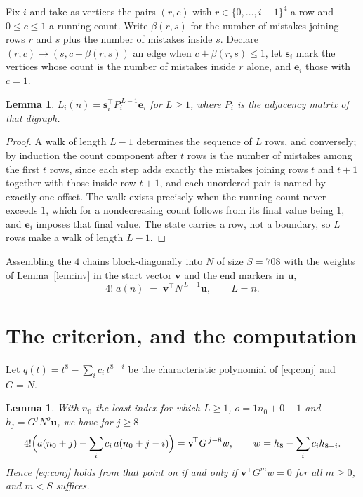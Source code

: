 \documentclass[11pt,a4paper]{article}
\theoremstyle{plain}
\newtheorem{lemma}[theorem]{Lemma}
\theoremstyle{definition}
\begin{document}
Fix $i$ and take as vertices the pairs $(r,c)$ with $r\in\{0,\dots,i-1\}^{4}$ a row
and $0\le c\le1$ a running count. Write $\beta(r,s)$ for the number of mistakes joining
rows $r$ and $s$ plus the number of mistakes inside $s$. Declare $(r,c)\to(s,c+\beta(r,s))$
an edge when $c+\beta(r,s)\le1$, let $\mathbf{s}_i$ mark the vertices whose count is the
number of mistakes inside $r$ alone, and $\mathbf{e}_i$ those with $c=1$.

\begin{lemma}\label{lem:walk}
$L_i(n)=\mathbf{s}_i^{\!\top}P_i^{\,L-1}\mathbf{e}_i$ for $L\ge1$, where $P_i$ is the
adjacency matrix of that digraph.
\end{lemma}

\begin{proof}
A walk of length $L-1$ determines the sequence of $L$ rows, and conversely; by induction
the count component after $t$ rows is the number of mistakes among the first $t$ rows,
since each step adds exactly the mistakes joining rows $t$ and $t+1$ together with those
inside row $t+1$, and each unordered pair is named by exactly one offset. The walk exists
precisely when the running count never exceeds $1$, which for a nondecreasing count follows
from its final value being $1$, and $\mathbf{e}_i$ imposes that final value. The state
carries a row, not a boundary, so $L$ rows make a walk of length $L-1$.
\end{proof}

Assembling the $4$ chains block-diagonally into $N$ of size $S=708$ with the weights of
Lemma~\ref{lem:inv} in the start vector $\mathbf{v}$ and the end markers in
$\mathbf{u}$,
\begin{equation}\label{eq:walk2}
4!\;a(n)\;=\;\mathbf{v}^{\!\top}N^{\,L-1}\mathbf{u},\qquad L=n .
\end{equation}

\section{The criterion, and the computation}

Let $q(t)=t^{8}-\sum_i c_i\,t^{8-i}$ be the characteristic polynomial of
\eqref{eq:conj} and $G=N$.

\begin{lemma}\label{lem:crit}
With $n_0$ the least index for which $L\ge1$, $o=1n_0+0-1$ and
$h_j=G^{j}N^{o}\mathbf{u}$, we have for $j\ge8$
\[
4!\Bigl(a(n_0+j)-\sum_i c_i\,a(n_0+j-i)\Bigr)=\mathbf{v}^{\!\top}G^{\,j-8}w,
\qquad w=h_{8}-\sum_i c_ih_{8-i} .
\]
Hence \eqref{eq:conj} holds from that point on if and only if
$\mathbf{v}^{\!\top}G^{m}w=0$ for all $m\ge0$, and $m<S$ suffices.
\end{lemma}
\end{document}
